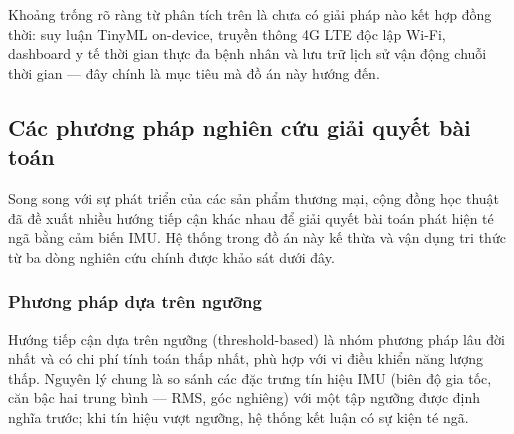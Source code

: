\documentclass[../DoAn.tex]{subfiles}
\begin{document}
Khoảng trống rõ ràng từ phân tích trên là chưa có giải pháp nào kết hợp đồng thời: suy luận TinyML on-device, truyền thông 4G LTE độc lập Wi-Fi, dashboard y tế thời gian thực đa bệnh nhân và lưu trữ lịch sử vận động chuỗi thời gian --- đây chính là mục tiêu mà đồ án này hướng đến.

\subsection{Các phương pháp nghiên cứu giải quyết bài toán}
\label{subsection:2.1.2}

Song song với sự phát triển của các sản phẩm thương mại, cộng đồng học thuật đã đề xuất nhiều hướng tiếp cận khác nhau để giải quyết bài toán phát hiện té ngã bằng cảm biến IMU. Hệ thống trong đồ án này kế thừa và vận dụng tri thức từ ba dòng nghiên cứu chính được khảo sát dưới đây.

\subsubsection{Phương pháp dựa trên ngưỡng}
\label{subsubsection:2.1.2.a}

Hướng tiếp cận dựa trên ngưỡng (threshold-based) là nhóm phương pháp lâu đời nhất và có chi phí tính toán thấp nhất, phù hợp với vi điều khiển năng lượng thấp. Nguyên lý chung là so sánh các đặc trưng tín hiệu IMU (biên độ gia tốc, căn bậc hai trung bình --- RMS, góc nghiêng) với một tập ngưỡng được định nghĩa trước; khi tín hiệu vượt ngưỡng, hệ thống kết luận có sự kiện té ngã.
\end{document}

